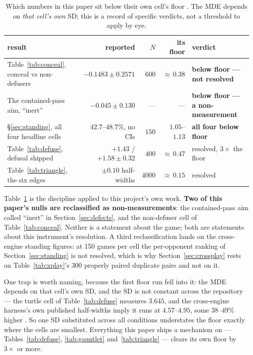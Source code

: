 \documentclass[11pt]{article}
\begin{document}
\begin{table}[t]
\centering
\caption{Which numbers in this paper sit below their own cell's floor
\cite{concession,floorpaper}. The MDE depends on \emph{that cell's own} SD; this is a record of
specific verdicts, not a threshold to apply by eye.}
\label{tab:floortable}
\footnotesize
\begin{tabular}{@{}lrrrl@{}}
\toprule
result & reported & $N$ & its floor & verdict \\
\midrule
Table~\ref{tab:conceal}, conceal vs non-defusers & $-0.1483 \pm 0.2571$ & $600$ & ${\approx}\,0.38$ & \textbf{below floor --- not resolved} \\
The contained-pass aim, ``inert'' & $-0.045 \pm 0.130$ & --- & --- & \textbf{below floor --- a non-measurement} \\
\S\ref{sec:standing}, all four headline cells & $42.7$--$48.7\%$, no CIs & $150$ & $1.05$--$1.13$ & \textbf{all four below floor} \\
Table~\ref{tab:defuse}, defusal shipped & $+1.43$ / $+1.58 \pm 0.32$ & $400$ & ${\approx}\,0.47$ & resolved, $3\times$ the floor \\
Table~\ref{tab:triangle}, the six edges & $\pm 0.10$ half-widths & $4000$ & ${\approx}\,0.15$ & resolved \\
\bottomrule
\end{tabular}
\end{table}

Table~\ref{tab:floortable} is the discipline applied to this project's own work. \textbf{Two of this
paper's nulls are reclassified as non-measurements}: the contained-pass aim called ``inert'' in
Section~\ref{sec:defects}, and the non-defuser cell of Table~\ref{tab:conceal}. Neither is a
statement about the game; both are statements about this instrument's resolution. A third
reclassification lands on the cross-engine standing figures: at 150 games per cell the per-opponent
ranking of Section~\ref{sec:standing} is not resolved, which is why Section~\ref{sec:crossplay}
rests on Table~\ref{tab:xplay}'s 300 properly paired duplicate pairs and not on it.

One trap is worth naming, because the first floor run fell into it: the MDE depends on that cell's
own SD, and the SD is not constant across the repository --- the turtle cell of
Table~\ref{tab:defuse} measures $3.645$, and the cross-engine harness's own published half-widths
imply it runs at $4.57$--$4.95$, some $38$--$49\%$ higher \cite{floorpaper}. So one SD substituted
across all conditions understates the floor exactly where the cells are smallest. Everything this
paper ships a mechanism on --- Tables~\ref{tab:defuse}, \ref{tab:gauntlet} and~\ref{tab:triangle}
--- clears its own floor by $3\times$ or more.
\end{document}
